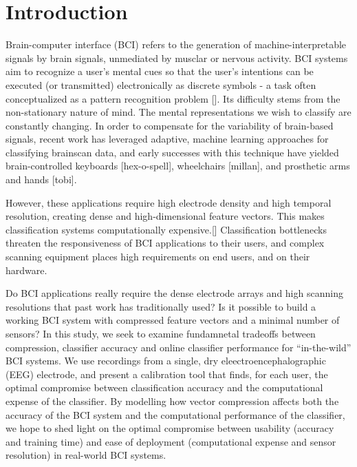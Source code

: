 \section{Introduction}

Brain-computer interface (BCI) refers to the generation of machine-interpretable signals by brain signals, unmediated by musclar or nervous activity. BCI systems aim to recognize a user's mental cues so that the user's intentions can be executed (or transmitted) electronically as discrete symbols - a task often conceptualized as a pattern recognition problem []. Its difficulty stems from the non-stationary nature of mind. The mental representations we wish to classify are constantly changing. In order to compensate for the variability of brain-based signals, recent work has leveraged adaptive, machine learning approaches for classifying brainscan data, and early successes with this technique have yielded brain-controlled keyboards [hex-o-spell], wheelchairs [millan], and prosthetic arms and hands [tobi].

However, these applications require high electrode density and high temporal resolution, creating dense and high-dimensional feature vectors. This makes classification systems computationally expensive.[] Classification bottlenecks threaten the responsiveness of BCI applications to their users, and complex scanning equipment places high requirements on end users, and on their hardware. 

Do BCI applications really require the dense electrode arrays and high scanning resolutions that past work has traditionally used? Is it possible to build a working BCI system with compressed feature vectors and a minimal number of sensors? In this study, we seek to examine fundamnetal tradeoffs between compression, classifier accuracy and online classifier performance for ``in-the-wild'' BCI systems. We use recordings from a single, dry eleectroencephalographic (EEG) electrode, and present a calibration tool that finds, for each user, the optimal compromise between classification accuracy and the computational expense of the classifier. By modelling how vector compression affects both the accuracy of the BCI system and the computational performance of the classifier, we hope to shed light on the optimal compromise between usability (accuracy and training time) and ease of deployment (computational expense and sensor resolution) in real-world BCI systems.



